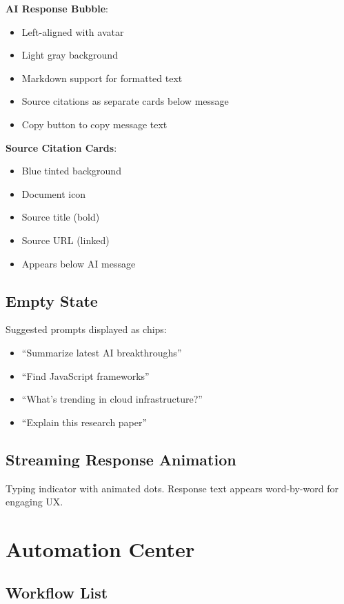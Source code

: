 \documentclass{report}
\begin{document}
\textbf{AI Response Bubble}:
\begin{itemize}
    \item Left-aligned with avatar
    \item Light gray background
    \item Markdown support for formatted text
    \item Source citations as separate cards below message
    \item Copy button to copy message text
\end{itemize}

\textbf{Source Citation Cards}:
\begin{itemize}
    \item Blue tinted background
    \item Document icon
    \item Source title (bold)
    \item Source URL (linked)
    \item Appears below AI message
\end{itemize}

\subsection{Empty State}

Suggested prompts displayed as chips:
\begin{itemize}
    \item ``Summarize latest AI breakthroughs''
    \item ``Find JavaScript frameworks''
    \item ``What's trending in cloud infrastructure?''
    \item ``Explain this research paper''
\end{itemize}

\subsection{Streaming Response Animation}

Typing indicator with animated dots. Response text appears word-by-word for engaging UX.

\section{Automation Center}

\subsection{Workflow List}
\end{document}
